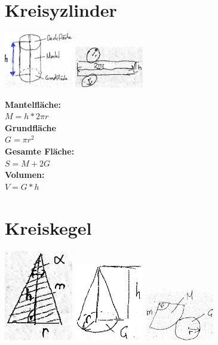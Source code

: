 \documentclass[10pt,a4paper]{article}
\title{\titleText}
\author{\authorText}
\date{\dateText}
\begin{document}
	\begin{multicols}{4}
		
		\section{Kreisyzlinder}
		\includegraphics[width=3cm]{imgs/zyl1}
		\includegraphics[width=3cm]{imgs/zyl2}
		
		
		\textbf{Mantelfläche:}\\
		\(M = h * 2\pi r\)\\
		\textbf{Grundfläche}\\
		\(G = \pi r^2 \)\\
		\textbf{Gesamte Fläche:}\\
		\(S=M + 2G\)\\
		\textbf{Volumen:}\\
		\(V = G * h \)\\
		
		\section{Kreiskegel}
		
		\includegraphics[width=3cm]{imgs/keg1}
		\includegraphics[width=3cm]{imgs/keg2}
		\includegraphics[width=3cm]{imgs/keg3}
		

\end{multicols}
\end{document}
